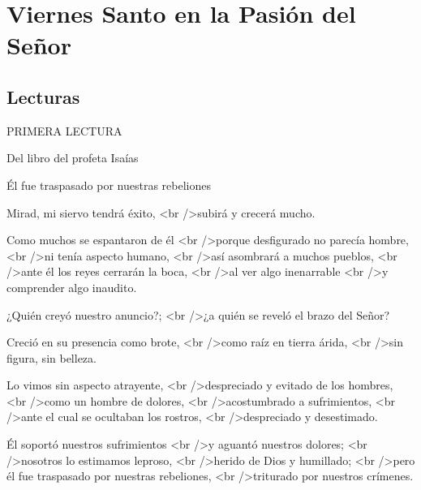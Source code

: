 			\chapter{Viernes Santo en la Pasión del Señor}
			
			\section{Lecturas}
			
			\begin{readtitle}PRIMERA LECTURA\end{readtitle}
			
			\begin{readbook}Del libro del profeta Isaías \end{readbook}
			
			\begin{readtheme}Él fue traspasado por nuestras rebeliones\end{readtheme}
			
			\begin{readtalk}Mirad, mi siervo tendrá éxito, <br />subirá y crecerá mucho. \end{readtalk}
			
			\begin{readtalk}Como muchos se espantaron de él <br />porque desfigurado no parecía hombre, <br />ni tenía aspecto humano, <br />así asombrará a muchos pueblos, <br />ante él los reyes cerrarán la boca, <br />al ver algo inenarrable <br />y comprender algo inaudito. \end{readtalk}
			
			\begin{readtalk}¿Quién creyó nuestro anuncio?; <br />¿a quién se reveló el brazo del Señor? \end{readtalk}
			
			\begin{readtalk}Creció en su presencia como brote, <br />como raíz en tierra árida, <br />sin figura, sin belleza. \end{readtalk}
			
			\begin{readtalk}Lo vimos sin aspecto atrayente, <br />despreciado y evitado de los hombres, <br />como un hombre de dolores, <br />acostumbrado a sufrimientos, <br />ante el cual se ocultaban los rostros, <br />despreciado y desestimado. \end{readtalk}
			
			\begin{readtalk}Él soportó nuestros sufrimientos <br />y aguantó nuestros dolores; <br />nosotros lo estimamos leproso, <br />herido de Dios y humillado; <br />pero él fue traspasado por nuestras rebeliones, <br />triturado por nuestros crímenes. \end{readtalk}
			
